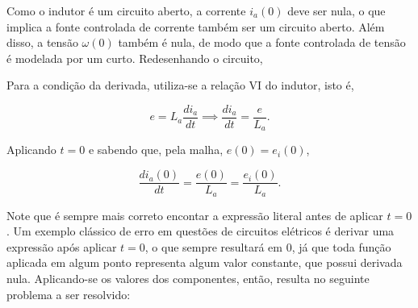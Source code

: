\documentclass{article}
\numberwithin{equation}{section}
\let\dfr\dfrac
\begin{document}
\begin{center}
\end{center}

\noindent Como o indutor é um circuito aberto, a corrente $i_a(0)$ deve ser nula, o que implica a fonte controlada de corrente também ser um circuito aberto. Além disso, a tensão $\omega(0)$ também é nula, de modo que a fonte controlada de tensão é modelada por um curto. Redesenhando o circuito,

\begin{center}
\end{center}

\noindent Para a condição da derivada, utiliza-se a relação VI do indutor, isto é,

\begin{equation*}
    e = L_a \dfr{di_a}{dt} \implies \dfr{di_a}{dt} = \dfr{e}{L_a}.
\end{equation*}

\noindent Aplicando $t=0$ e sabendo que, pela malha, $e(0)=e_i(0)$,

\begin{equation*}
    \dfr{di_a(0)}{dt} = \dfr{e(0)}{L_a} = \dfr{e_i(0)}{L_a}.
\end{equation*}

\noindent Note que é sempre mais correto encontar a expressão literal antes de aplicar $t=0$. Um exemplo clássico de erro em questões de circuitos elétricos é derivar uma expressão após aplicar $t=0$, o que sempre resultará em $0$, já que toda função aplicada em algum ponto representa algum valor constante, que possui derivada nula. Aplicando-se os valores dos componentes, então, resulta no seguinte problema a ser resolvido:
\end{document}
